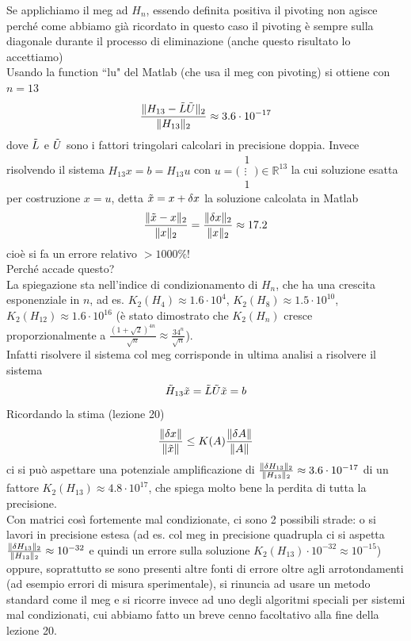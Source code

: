 \documentclass[12pt,a4paper]{article}
\DeclarePairedDelimiter{\norma}{\lVert}{\rVert}
\begin{document}
Se applichiamo il meg ad $H_n$, essendo definita positiva il pivoting non agisce perché come abbiamo già ricordato in questo caso il pivoting è sempre sulla diagonale durante il processo di eliminazione (anche questo risultato lo accettiamo) \\
Usando la function ``lu" del Matlab (che usa il meg con pivoting) si ottiene con $n=13$
\begin{equation*}
    \frac{\norma{H_{13}-\Tilde{L}\Tilde{U}}_2}{\norma{H_{13}}_2} \approx 3.6\cdot 10^{-17}
\end{equation*}
dove $\Tilde{L}$ e $\Tilde{U}$ sono i fattori tringolari calcolari in precisione doppia. Invece risolvendo il sistema $H_{13}x=b=H_{13}u$ con $u=\biggl(\begin{smallmatrix} 1 \\ \vdots \\ 1 \end{smallmatrix}\biggr) \in \mathbb{R}^{13}$ la cui soluzione esatta per costruzione $x=u$, detta $\Tilde{x}=x+\delta x$ la soluzione calcolata in Matlab
\begin{equation*}
    \frac{\norma{\Tilde{x}-x}_2}{\norma{x}_2}=\frac{\norma{\delta x}_2}{\norma{x}_2} \approx 17.2
\end{equation*}
cioè si fa un errore relativo $>1000\%$! \\
Perché accade questo?\\
La spiegazione sta nell'indice di condizionamento di $H_n$, che ha una crescita esponenziale in $n$, ad es. $K_2(H_4)\approx 1.6 \cdot 10^4$, $K_2(H_8) \approx 1.5\cdot 10^{10}$, $K_2(H_{12}) \approx 1.6 \cdot 10^{16}$ (è stato dimostrato che $K_2(H_n)$ cresce proporzionalmente a $\frac{(1+\sqrt{2})^{4n}}{\sqrt{n}} \approx \frac{34^n}{\sqrt{n}}$). \\
Infatti risolvere il sistema col meg corrisponde in ultima analisi a risolvere il sistema
\begin{equation*}
    \Tilde{H}_{13}\Tilde{x} = \Tilde{L}\Tilde{U}\Tilde{x}=b
\end{equation*}
Ricordando la stima (lezione 20)
\begin{equation*}
    \frac{\norma{\delta x}}{\norma{\Tilde{x}}} \leq K(A) \frac{\norma{\delta A}}{\norma{A}}
\end{equation*}
ci si può aspettare una potenziale amplificazione di $\frac{\norma{\delta H_{13}}_2}{\norma{H_{13}}_2} \approx 3.6 \cdot 10^{-17}$ di un fattore $K_2(H_{13}) \approx 4.8 \cdot 10^{17}$, che spiega molto bene la perdita di tutta la precisione. \\Con matrici così fortemente mal condizionate, ci sono 2 possibili strade: o si lavori in precisione estesa (ad es. col meg in precisione quadrupla ci si aspetta $\frac{\norma{\delta H_{13}}_2}{\norma{H_{13}}_2} \approx  10^{-32}$ e quindi un errore sulla soluzione $K_2(H_{13}) \cdot 10^{-32} \approx 10^{-15}$) oppure, soprattutto se sono presenti altre fonti di errore oltre agli arrotondamenti (ad esempio errori di misura sperimentale), si rinuncia ad usare un metodo standard come il meg e si ricorre invece ad uno degli algoritmi speciali per sistemi mal condizionati, cui abbiamo fatto un breve cenno facoltativo alla fine della lezione 20.
\end{document}
